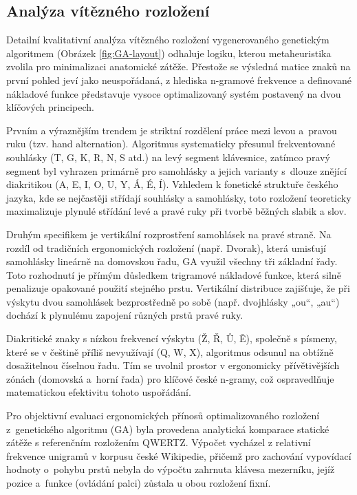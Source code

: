 \documentclass[a4paper, twoside, 12pt, czech]{article}
\begin{document}
\subsection{Analýza vítězného rozložení}
Detailní kvalitativní analýza vítězného rozložení vygenerovaného genetickým algoritmem 
(Obrázek \ref{fig:GA-layout}) odhaluje logiku, kterou metaheuristika zvolila pro minimalizaci 
anatomické zátěže. Přestože se výsledná matice znaků na první pohled jeví jako 
neuspořádaná, z hlediska n-gramové frekvence a definované nákladové funkce 
představuje vysoce optimalizovaný systém postavený na dvou klíčových principech.

Prvním a výraznějším trendem je striktní rozdělení práce mezi levou a~pravou 
ruku (tzv. hand alternation). Algoritmus systematicky přesunul frekventované 
souhlásky (T, G, K, R, N, S atd.) na levý segment klávesnice, zatímco pravý 
segment byl vyhrazen primárně pro samohlásky a jejich varianty s~dlouze znějící 
diakritikou (A, E, I, O, U, Y, Á, É, Í). Vzhledem k fonetické struktuře českého 
jazyka, kde se nejčastěji střídají souhlásky a samohlásky, toto rozložení 
teoreticky maximalizuje plynulé střídání levé a pravé ruky při tvorbě běžných 
slabik a slov.

Druhým specifikem je vertikální rozprostření samohlásek na pravé straně. Na 
rozdíl od tradičních ergonomických rozložení (např. Dvorak), která umisťují 
samohlásky lineárně na domovskou řadu, GA využil všechny tři základní řady. Toto 
rozhodnutí je přímým důsledkem trigramové nákladové funkce, která silně penalizuje 
opakované použití stejného prstu. Vertikální distribuce zajišťuje, 
že při výskytu dvou samohlásek bezprostředně po sobě (např. dvojhlásky „ou“, „au“) 
dochází k plynulému zapojení různých prstů pravé ruky.

Diakritické znaky s nízkou frekvencí výskytu (Ž, Ř, Ů, Ě), společně s písmeny, které 
se v češtině příliš nevyužívají (Q, W, X), algoritmus odsunul na obtížně dosažitelnou 
číselnou řadu. Tím 
se uvolnil prostor v ergonomicky přívětivějších zónách (domovská a~horní řada) pro 
klíčové české n-gramy, což ospravedlňuje matematickou efektivitu tohoto uspořádání.

Pro objektivní evaluaci ergonomických přínosů optimalizovaného rozložení z~genetického 
algoritmu (GA) byla provedena analytická komparace statické zátě\-že s referenčním 
rozložením QWERTZ. Výpočet vycházel z relativní frekvence unigramů v korpusu české 
Wikipedie, přičemž pro zachování vypovídací hodnoty o~pohybu prstů nebyla do výpočtu 
zahrnuta klávesa mezerníku, jejíž pozice a~funkce (ovládání palci) zůstala u obou 
rozložení fixní.
\end{document}
